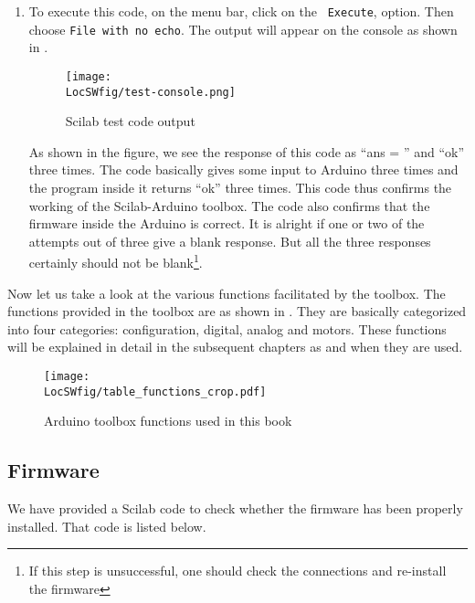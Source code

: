 \begin{enumerate}
      \item To execute this code, on the menu bar, click on the {\tt
                        Execute}, option. Then choose {\tt File with no echo}. The output
            will appear on the console as shown in .
            \begin{figure}
                  \centering
                  \texttt{[image: \\LocSWfig/test-console.png]}
                  \caption{Scilab test code output}
                  \label{test-console}
            \end{figure}
            As shown in the figure, we see the response of this code as ``ans = '' and
            ``ok'' three times.  The
            code basically gives some input to Arduino three times and the
            program inside it returns ``ok'' three times.  This code thus confirms
            the working of the Scilab-Arduino toolbox.  The code also confirms
            that the firmware inside the Arduino is correct.  It is alright if
            one or two of the attempts out of three give a blank response.  But
            all the three responses certainly should not be
            blank\footnote{\label{fn:firmware}If this step is unsuccessful,
                  one should check the connections and re-install the firmware}.
\end{enumerate}

Now let us take a look at the various functions facilitated by the
toolbox. The functions provided in the toolbox are as shown in 
. They are basically categorized into four categories:
configuration, digital, analog and motors. These functions will be
explained in detail in the subsequent chapters as and when they are
used.

\begin{figure}
      \centering
      \texttt{[image: \\LocSWfig/table\_functions\_crop.pdf]}
      \caption{Arduino toolbox functions used in this book}
      \label{func}
\end{figure}

\subsection{Firmware}
\lstset{style=mystyle}
\label{sec:test-firmware-scilab}
We have provided a Scilab code to check whether the firmware has been
properly installed.  That code is listed below.

\begin{scicode}
      \label{sci:test-firmware}
      
\end{scicode}



